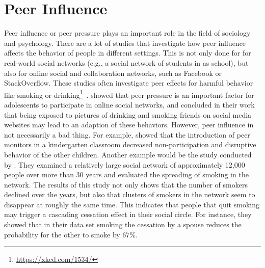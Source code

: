 

\section{Peer Influence}
\label{sec:peer-influence}

Peer influence or peer pressure plays an important role in the field of sociology and psychology.
There are a lot of studies that investigate how peer influence affects the behavior of people in different settings.
This is not only done for for real-world social networks (e.g., a social network of students in  as school), but also for online social and collaboration networks, such as Facebook or StackOverflow.
These studies often investigate peer effects for harmful behavior like smoking or drinking\footnote{\url{https://xkcd.com/1534/}}~\cite{Simons2001, Powell2005}.
\citet{Krasnova2008} showed that peer pressure is an important factor for adolescents to participate in online social networks, and \citet{Huang2014} concluded in their work that being exposed to pictures of drinking and smoking friends on social media websites may lead to an adaption of these behaviors.
However, peer influence in not necessarily a bad thing.
For example, \citet{Smith1984} showed that the introduction of peer monitors in a kindergarten classroom decreased non-participation and disruptive behavior of the other children.
Another example would be the study conducted by \citet{Christakis2008}.
They examined a relatively large social network of approximately 12,000 people over more than 30 years and evaluated the spreading of smoking in the network.
The results of this study  not only shows that the number of smokers declined over the years, but also that clusters of smokers in the network seem to disappear at roughly the same time.
This indicates that people that quit smoking may trigger a cascading cessation effect in their social circle.
For instance, they showed that in their data set smoking the cessation by a spouse reduces the probability for the other to smoke by 67\%.

